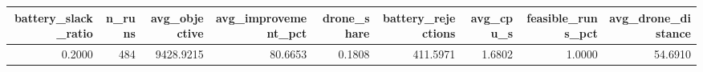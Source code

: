 \begin{tabular}{rrrrrrrrr}
\toprule
battery_slack_ratio & n_runs & avg_objective & avg_improvement_pct & drone_share & battery_rejections & avg_cpu_s & feasible_runs_pct & avg_drone_distance \\
\midrule
0.2000 & 484 & 9428.9215 & 80.6653 & 0.1808 & 411.5971 & 1.6802 & 1.0000 & 54.6910 \\
\bottomrule
\end{tabular}
